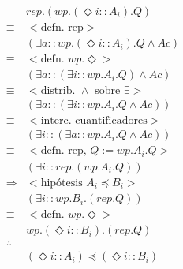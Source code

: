 \documentclass{article}
\begin{document}
\begin{align*}
 & rep.(wp.(\Diamond i :: A_i).Q) \\
 \equiv & <\text{defn. rep}> \\
 & (\exists a :: wp.(\Diamond i :: A_i).Q \wedge Ac) \\
 \equiv & <\text{defn. } wp.\Diamond> \\
 & (\exists a :: (\exists i :: wp.A_i.Q) \wedge Ac) \\
 \equiv & <\text{distrib. } \wedge \text{ sobre } \exists> \\
 & (\exists a :: (\exists i :: wp.A_i.Q \wedge Ac)) \\
 \equiv & <\text{interc. cuantificadores}> \\
 & (\exists i :: (\exists a :: wp.A_i.Q \wedge Ac)) \\
 \equiv & <\text{defn. rep, } Q := wp.A_i.Q> \\
 & (\exists i :: rep.(wp.A_i.Q)) \\
 \Rightarrow & <\text{hipótesis } A_i \preccurlyeq B_i> \\
 & (\exists i :: wp.B_i.(rep.Q)) \\
 \equiv & <\text{defn. } wp.\Diamond> \\
 & wp.(\Diamond i :: B_i).(rep.Q) \\
 \therefore & \\
 & (\Diamond i :: A_i) \preccurlyeq (\Diamond i :: B_i) \\
\end{align*}

\section{}
\end{document}
